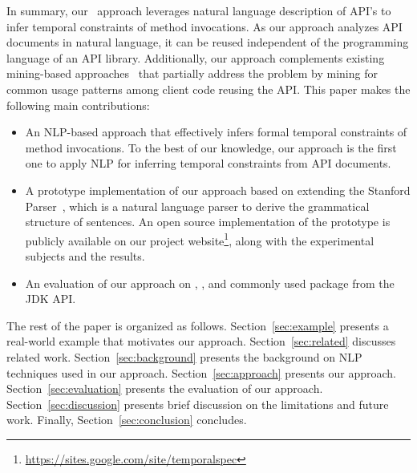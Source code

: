 In summary, our \tool\ approach leverages natural language description of API's to infer temporal constraints of method invocations.
As our approach analyzes API documents in natural language, it can be reused independent of the programming language of an API library.
Additionally, our approach complements existing mining-based approaches~\cite{buse2012synthesizing, thummalapenta07parseweb, Wang:2013:MSR, Zhong:2009:MMR} that partially address the problem by mining for common usage patterns among client code reusing the API.
This paper makes the following main contributions:

\begin{itemize}
	\item An NLP-based approach that effectively infers formal temporal constraints of method invocations. 
	To the best of our knowledge, our approach is the first one to apply NLP for inferring temporal constraints from API documents.
	\item A prototype implementation of our approach based on extending the Stanford Parser~\cite{Klein03}, which is a natural language parser to derive the grammatical structure of sentences.
	An open source implementation of the prototype is publicly available on our project website\footnote{\url{https://sites.google.com/site/temporalspec}}, along with the experimental subjects and the results. 
	\item An evaluation of our approach on \amazonAPI, \paypalAPI, and commonly used package  from the JDK API. 
\end{itemize}


The rest of the paper is organized as follows.
Section~\ref{sec:example} presents a real-world example that motivates our approach.
Section~\ref{sec:related} discusses related work.
Section~\ref{sec:background} presents the  background on NLP techniques used in our approach.
Section~\ref{sec:approach} presents our approach.
Section~\ref{sec:evaluation} presents the evaluation of our approach.
Section~\ref{sec:discussion} presents brief discussion on the limitations and future work.
Finally, Section~\ref{sec:conclusion} concludes.


